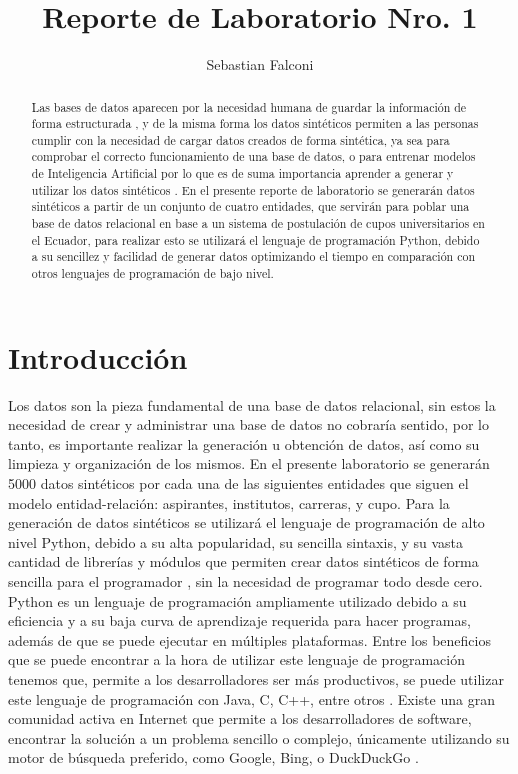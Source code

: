 \documentclass[10pt, oneside,spanish]{article}   	%
\title{Reporte de Laboratorio Nro. 1}
\author[L00368514]{Sebastian Falconi}
\affil[ ]{Universidad de las Fuerzas Armadas}
\affil[ ]{sdfalconi@espe.edu.ec}
\affil[ ]{}
\affil[ ]{Creación de datos sintéticos}
\date{}							%
\begin{document}
\maketitle

\begin{abstract}
Las bases de datos aparecen por la necesidad humana de guardar la información de forma estructurada \cite{beynon-davies_sistemas_2018}, y de la misma forma los datos sintéticos permiten a las personas cumplir con la necesidad de cargar datos creados de forma sintética, ya sea para comprobar el correcto funcionamiento de una base de datos, o para entrenar modelos de Inteligencia Artificial por lo que es de suma importancia aprender a generar y utilizar los datos sintéticos \cite{rivera_base_2008}. En el presente reporte de laboratorio se generarán datos sintéticos a partir de un conjunto de cuatro entidades, que servirán para poblar una base de datos relacional en base a un sistema de postulación de cupos universitarios en el Ecuador, para realizar esto se utilizará el lenguaje de programación Python, debido a su sencillez y facilidad de generar datos optimizando el tiempo en comparación con otros lenguajes de programación de bajo nivel.
\end{abstract}

\section{Introducción}
Los datos son la pieza fundamental de una base de datos relacional\cite{ricardo_bases_2009}, sin estos la necesidad de crear y administrar una base de datos no cobraría sentido, por lo tanto, es importante realizar la generación u obtención de datos, así como su limpieza y organización de los mismos.  En el presente laboratorio se generarán 5000 datos sintéticos por cada una de las siguientes entidades que siguen el modelo entidad-relación: aspirantes, institutos, carreras, y cupo. Para la generación de datos sintéticos se utilizará el lenguaje de programación de alto nivel Python, debido a su alta popularidad, su sencilla sintaxis, y su vasta cantidad de librerías y módulos que permiten crear datos sintéticos de forma sencilla para el programador \cite{fernandez_python_2013}, sin la necesidad de programar todo desde cero. Python es un lenguaje de programación ampliamente utilizado debido a su eficiencia y a su baja curva de aprendizaje requerida para hacer programas, además de que se puede ejecutar en múltiples plataformas. Entre los beneficios que se puede encontrar a la hora de utilizar este lenguaje de programación tenemos que, permite a los desarrolladores ser más productivos, se puede utilizar este lenguaje de programación con Java, C, C++, entre otros \cite{chazallet_python_2016}. Existe una gran comunidad activa en Internet que permite a los desarrolladores de software, encontrar la solución a un problema sencillo o complejo, únicamente utilizando su motor de búsqueda preferido, como Google, Bing, o DuckDuckGo \cite{fernandez_python_2013}.
\end{document}
